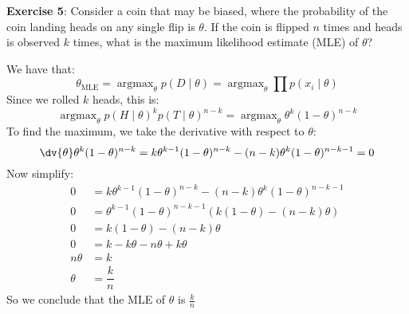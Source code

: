 \documentclass{article}
\begin{document}
    \textbf{Exercise 5}: Consider a coin that may be biased, where the probability of the coin landing heads on any single flip is $\theta$. If the coin is flipped $n$ times and heads is observed $k$ times, what is the maximum likelihood estimate (MLE) of $\theta$?
        \begin{answer}
            We have that:
                \begin{equation*}
                    \theta_{\text{MLE}} = \mathop{argmax}_{\theta} p(D \mid \theta) = \mathop{argmax}_{\theta} \prod p(x_{i} \mid \theta)
                \end{equation*}
            Since we rolled $k$ heads, this is:
                \begin{equation*}
                    \mathop{argmax}_{\theta} p(H \mid \theta)^{k} p(T \mid \theta)^{n - k} = \mathop{argmax}_{\theta} \theta^{k}(1 - \theta)^{n - k}
                \end{equation*}
            To find the maximum, we take the derivative with respect to $\theta$:
                \begin{equation*}
                    \dv{\theta} \theta^{k}(1 - \theta)^{n - k} = k\theta^{k - 1}(1 - \theta)^{n - k} - (n - k)\theta^{k}(1 - \theta)^{n - k - 1} = 0
                \end{equation*}
            Now simplify:
                \begin{align*}
                    0       &= k\theta^{k - 1}(1 - \theta)^{n - k} - (n - k)\theta^{k}(1 - \theta)^{n - k - 1} \\
                    0       &= \theta^{k - 1}(1 - \theta)^{n - k - 1}(k(1 - \theta) - (n - k)\theta)           \\
                    0       &= k(1 - \theta) - (n - k)\theta                                                   \\
                    0       &= k - k\theta - n\theta + k\theta                                                 \\
                    n\theta &= k                                                                               \\
                    \theta  &= \dfrac{k}{n}                                                                      
                \end{align*}
            So we conclude that the MLE of $\theta$ is $\frac{k}{n}$
        \end{answer}
\end{document}
